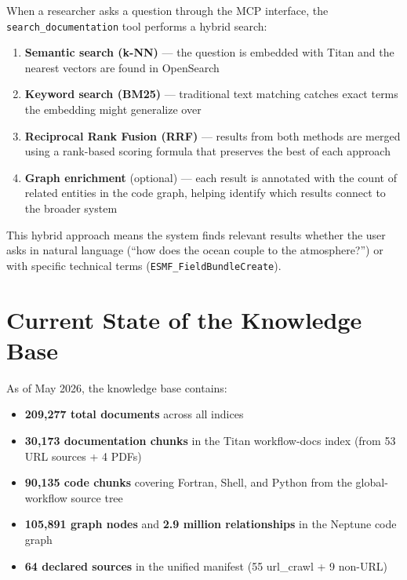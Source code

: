 \documentclass[11pt,letterpaper]{article}
\begin{document}
When a researcher asks a question through the MCP interface, the
\texttt{search\_documentation} tool performs a hybrid search:

\begin{enumerate}[nosep]
    \item \textbf{Semantic search (k-NN)} — the question is embedded
    with Titan and the nearest vectors are found in OpenSearch
    \item \textbf{Keyword search (BM25)} — traditional text matching
    catches exact terms the embedding might generalize over
    \item \textbf{Reciprocal Rank Fusion (RRF)} — results from both
    methods are merged using a rank-based scoring formula that
    preserves the best of each approach
    \item \textbf{Graph enrichment} (optional) — each result is
    annotated with the count of related entities in the code graph,
    helping identify which results connect to the broader system
\end{enumerate}

This hybrid approach means the system finds relevant results whether
the user asks in natural language (``how does the ocean couple to the
atmosphere?'') or with specific technical terms
(\texttt{ESMF\_FieldBundleCreate}).

\section{Current State of the Knowledge Base}

As of May 2026, the knowledge base contains:

\begin{itemize}[nosep]
    \item \textbf{209,277 total documents} across all indices
    \item \textbf{30,173 documentation chunks} in the Titan workflow-docs
    index (from 53 URL sources + 4 PDFs)
    \item \textbf{90,135 code chunks} covering Fortran, Shell, and
    Python from the global-workflow source tree
    \item \textbf{105,891 graph nodes} and \textbf{2.9 million
    relationships} in the Neptune code graph
    \item \textbf{64 declared sources} in the unified manifest (55
    url\_crawl + 9 non-URL)
\end{itemize}
\end{document}
